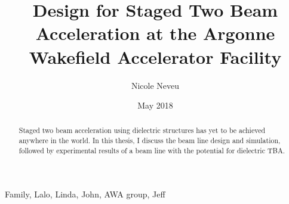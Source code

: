 \documentclass{iitthesis}
\begin{document}
\title{Design for Staged Two Beam Acceleration at the Argonne Wakefield Accelerator Facility}

\author{Nicole Neveu }
\date{May 2018}
\copyrightnoticetrue      %
\maketitle                %


\prelimpages         %

\begin{acknowledgement}     %
	\par  Family, Lalo, Linda, John, AWA group, Jeff
\end{acknowledgement}

\tableofcontents
\clearpage

\listoftables
\clearpage

\listoffigures
\clearpage


\listofsymbols
{}

\clearpage

\begin{abstract}           %
	\par Staged two beam acceleration using dielectric structures has yet to 
	be achieved anywhere in the world. In this thesis, I discuss the beam 
	line design and simulation, followed by experimental results of a 
	beam line with the potential for dielectric TBA.   
\end{abstract}

\textpages     %
\end{document}
